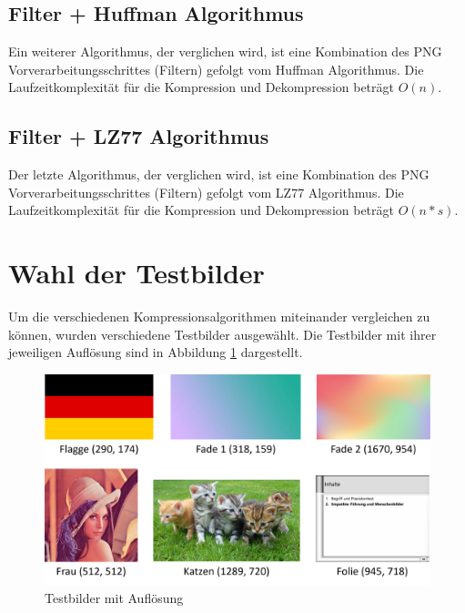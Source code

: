 \documentclass[conference]{IEEEtran}
\begin{document}
\subsection{Filter + Huffman Algorithmus}

Ein weiterer Algorithmus, der verglichen wird, ist eine Kombination des 
PNG Vorverarbeitungsschrittes (Filtern) gefolgt vom Huffman Algorithmus. 
Die Laufzeitkomplexität für die Kompression und Dekompression beträgt
$O(n)$.

\subsection{Filter + LZ77 Algorithmus}

Der letzte Algorithmus, der verglichen wird, ist eine Kombination des 
PNG Vorverarbeitungsschrittes (Filtern) gefolgt vom LZ77 Algorithmus.
Die Laufzeitkomplexität für die Kompression und Dekompression beträgt
$O(n * s)$.

\section{Wahl der Testbilder}

Um die verschiedenen Kompressionsalgorithmen miteinander vergleichen 
zu können, wurden verschiedene Testbilder ausgewählt. 
Die Testbilder mit ihrer jeweiligen Auflösung sind in 
Abbildung \ref{fig:testbilder} dargestellt.

\begin{figure}[h]
  \centering
  \includegraphics[width=\columnwidth]{./images/Images.png}
  \caption{Testbilder mit Auflösung}
  \label{fig:testbilder}
\end{figure}
\end{document}
